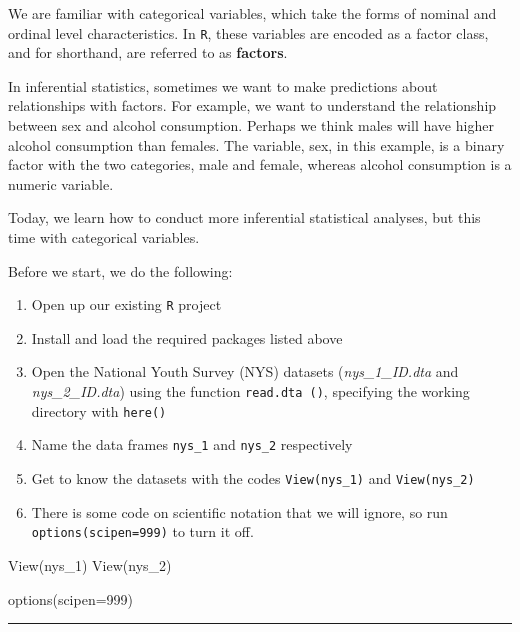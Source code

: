\documentclass[
]{book}
\newenvironment{Shaded}{\begin{snugshade}}{\end{snugshade}}
\newcommand{\AttributeTok}[1]{\textcolor[rgb]{0.77,0.63,0.00}{#1}}
\newcommand{\DecValTok}[1]{\textcolor[rgb]{0.00,0.00,0.81}{#1}}
\newcommand{\FunctionTok}[1]{\textcolor[rgb]{0.00,0.00,0.00}{#1}}
\newcommand{\NormalTok}[1]{#1}
\begin{document}
We are familiar with categorical variables, which take the forms of nominal and ordinal level characteristics. In \texttt{R}, these variables are encoded as a factor class, and for shorthand, are referred to as \textbf{factors}.

In inferential statistics, sometimes we want to make predictions about relationships with factors. For example, we want to understand the relationship between sex and alcohol consumption. Perhaps we think males will have higher alcohol consumption than females. The variable, sex, in this example, is a binary factor with the two categories, male and female, whereas alcohol consumption is a numeric variable.

Today, we learn how to conduct more inferential statistical analyses, but this time with categorical variables.

Before we start, we do the following:

\begin{enumerate}
\def\labelenumi{\arabic{enumi}.}
\item
  Open up our existing \texttt{R} project
\item
  Install and load the required packages listed above
\item
  Open the National Youth Survey (NYS) datasets (\emph{nys\_1\_ID.dta} and \emph{nys\_2\_ID.dta}) using the function \texttt{read.dta\ ()}, specifying the working directory with \texttt{here()}
\item
  Name the data frames \texttt{nys\_1} and \texttt{nys\_2} respectively
\item
  Get to know the datasets with the codes \texttt{View(nys\_1)} and \texttt{View(nys\_2)}
\item
  There is some code on scientific notation that we will ignore, so run \texttt{options(scipen=999)} to turn it off.
\end{enumerate}

\begin{Shaded}
\begin{Highlighting}[]
\FunctionTok{View}\NormalTok{(nys\_1)}
\FunctionTok{View}\NormalTok{(nys\_2)}

\FunctionTok{options}\NormalTok{(}\AttributeTok{scipen=}\DecValTok{999}\NormalTok{)}
\end{Highlighting}
\end{Shaded}

\begin{center}\rule{0.5\linewidth}{0.5pt}\end{center}
\end{document}
